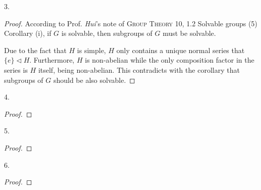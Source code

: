 \begin{exercise}
    3.
\end{exercise}

\begin{proof}
    According to Prof. \textit{Hui}'s note of \textsc{Group Theory 10}, 1.2 Solvable groups (5) Corollary (i), if $G$ is solvable, then subgroups of $G$ must be solvable.

    Due to the fact that $H$ is simple, $H$ only contains a unique normal series that $\{e\}\triangleleft H$. Furthermore, $H$ is non-abelian while the only composition factor in the series is $H$ itself, being non-abelian. This contradicts with the corollary that subgroups of $G$ should be also solvable.
\end{proof}

\begin{exercise}
    4.
\end{exercise}

\begin{proof}
    
\end{proof}

\begin{exercise}
    5.
\end{exercise}

\begin{proof}
    
\end{proof}

\begin{exercise}
    6.
\end{exercise}

\begin{proof}
    
\end{proof}